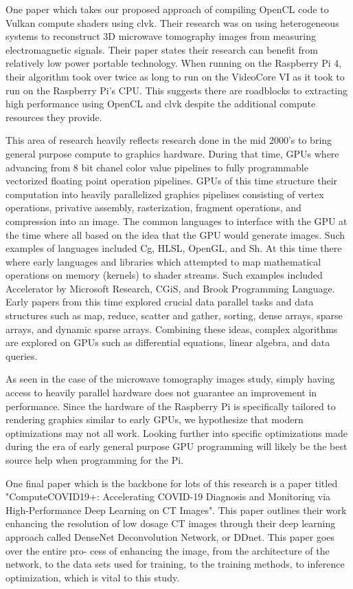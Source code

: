 \documentclass[conference]{IEEEtran}
\begin{document}
 One paper which takes our proposed approach of compiling OpenCL code to Vulkan compute shaders using clvk\cite{vasileiou_accelerated_nodate}.
 Their research was on using heterogeneous systems to reconstruct 3D microwave tomography images from measuring 
 electromagnetic signals. Their paper states their research can benefit from relatively low power portable technology. 
 When running on the Raspberry Pi 4, their algorithm took over twice as long to run on the VideoCore VI as it took 
 to run on the Raspberry Pi's CPU. This suggests there are roadblocks to extracting high performance using OpenCL and clvk 
 despite the additional compute resources they provide.

 This area of research heavily reflects research done in the mid 2000's to bring general purpose compute to 
 graphics hardware. During that time, GPUs where advancing from 8 bit chanel color value pipelines to 
 fully programmable vectorized floating point operation pipelines\cite{owens_survey_2007}. GPUs of this time 
 structure their computation into heavily parallelized graphics pipelines consisting of vertex operations, 
 privative assembly, rasterization, fragment operations, and compression into an image. The common languages to 
 interface with the GPU at the time where all based on the idea that the GPU would generate images. Such examples 
 of languages included Cg, HLSL, OpenGL, and Sh. At this time there where early languages and libraries which attempted 
 to map mathematical operations on memory (kernels) to shader streams.  Such examples included Accelerator by Microsoft 
 Research, CGiS, and Brook Programming Language. Early papers from this time explored crucial data parallel 
 tasks and data structures such as map, reduce, scatter and gather, sorting, dense arrays, sparse arrays, 
 and dynamic sparse arrays. Combining these ideas, complex algorithms are explored on GPUs such as differential 
 equations, linear algebra, and data queries. 
 
 As seen in the case of the microwave tomography images study, simply having access to heavily parallel hardware 
 does not guarantee an improvement in performance. Since the hardware of the Raspberry Pi is specifically tailored 
 to rendering graphics similar to early GPUs, we hypothesize that modern optimizations may not all work. 
 Looking further into specific optimizations made during the era of early general purpose GPU programming will likely
 be the best source help when programming for the Pi. 

 One final paper which is the backbone for lots of this research is a paper titled "ComputeCOVID19+:
 Accelerating COVID-19 Diagnosis and Monitoring via High-Performance Deep Learning on CT Images"\cite{goel_computecovid19_2021}.
This paper outlines their work enhancing the resolution of low dosage CT images through their deep
 learning approach called DenseNet Deconvolution Network, or DDnet. This paper goes over the entire pro-
 cess of enhancing the image, from the architecture of the network, to the data sets used for training, to the
 training methods, to inference optimization, which is vital to this study.
\end{document}
